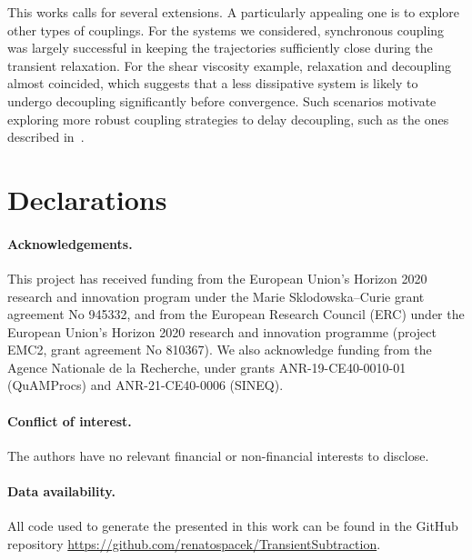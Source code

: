 \documentclass[11pt]{article}
\theoremstyle{definition}
\let\oldparagraph=\paragraph
\renewcommand\paragraph[1]{\oldparagraph{#1.}}
\begin{document}
This works calls for several extensions. A particularly appealing one is to explore other types of couplings. For the systems we considered, synchronous coupling was largely successful in keeping the trajectories sufficiently close during the transient relaxation. For the shear viscosity example, relaxation and decoupling almost coincided, which suggests that a less dissipative system is likely to undergo decoupling significantly before convergence. Such scenarios motivate exploring more robust coupling strategies to delay decoupling, such as the ones described in~\cite{guillin2012,monmarche2024,chak2024,darshan2024}. 

\section*{Declarations}
\paragraph{Acknowledgements} This project has received funding from the European Union's Horizon 2020 research and innovation program under the Marie Sklodowska--Curie grant agreement No 945332, and from the European Research Council (ERC) under the European Union's Horizon 2020 research and innovation programme (project EMC2, grant agreement No 810367). We also acknowledge funding from the Agence Nationale de la Recherche, under grants ANR-19-CE40-0010-01 (QuAMProcs) and ANR-21-CE40-0006 (SINEQ). 

\paragraph{Conflict of interest} The authors have no relevant financial or non-financial interests to disclose.

\paragraph{Data availability} All code used to generate the presented in this work can be found in the GitHub repository \url{https://github.com/renatospacek/TransientSubtraction}. 

\printbibliography
%
%
\end{document}
